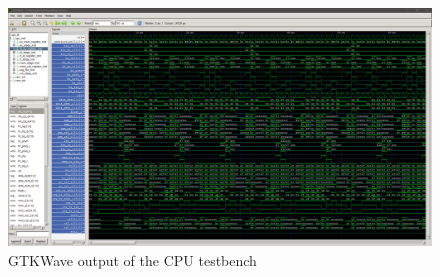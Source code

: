 \begin{figure}[H]
    \centering
    \includegraphics[width=1\textwidth]{testing/images/gtkwave.png}
    \caption{GTKWave output of the CPU testbench}
    \label{fig:gtkwave}
\end{figure}

